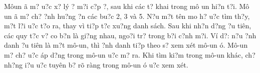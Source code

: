\documentclass{article} %
\begin{document}
\noindent M\^{o}{\dj}un {\dj}\~{a} m? {\dj}u?c x? l\'{y} ? m?i c?p {\dj}?, sau khi c\'{a}c t? khai trong m\^{o} {\dj}un hi?n t?i. M\^{o} {\dj}un {\dj}\~{a} m? ch? ?nh hu?ng {\dj}?n c\'{a}c bu?c 2, 3 v\`{a} 5. N?u m?t t\^{e}n mo h? {\dj}u?c t\`{i}m th?y, m?t l?i {\dj}u?c t?o ra, thay v\`{i} ti?p t?c xu?ng danh s\'{a}ch. Sau khi nh?n d?ng {\dj}?u ti\^{e}n, c\'{a}c quy t?c v? co b?n l\`{a} gi?ng nhau, ngo?i tr? trong b?i c?nh m?i. V\'{i} d?: n?u {\dj}?nh danh {\dj}?u ti\^{e}n l\`{a} m?t m\^{o}-{\dj}un, th\`{i} {\dj}?nh danh ti?p theo s? xem x\'{e}t m\^{o}-{\dj}un {\dj}\'{o}. M\^{o}-{\dj}un m? ch? {\dj}u?c \'{a}p d?ng trong m\^{o}-{\dj}un {\dj}u?c m? ra. Khi t\`{i}m ki?m trong m\^{o}-{\dj}un kh\'{a}c, ch? nh?ng {\dj}i?u {\dj}u?c tuy\^{e}n b? r\~{o} r\`{a}ng trong m\^{o}-{\dj}un {\dj}\'{o} {\dj}u?c xem x\'{e}t.

\noindent \textbf{}

\noindent 

\noindent 
\end{document}
